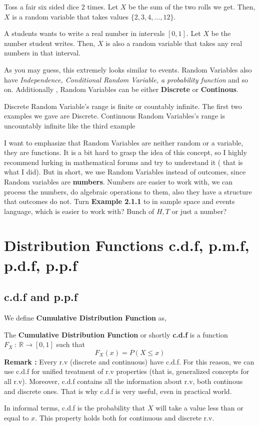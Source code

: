 \begin{example}
    Toss a fair six sided dice 2 times. Let $X$ be the sum of the two rolls we get. Then, $X$ is a random variable that takes values
    $\{2,3,4,...,12\}$.
\end{example}

\begin{example}
    A students wants to write a real number in intervals $[0,1]$. Let $X$ be the number student writes. Then, $X$ is also a random variable
    that takes any real numbers in that interval.
\end{example}

As you may guess, this extremely looks similar to events. Random Variables also have \textit{Independence, Conditional Random Variable, a
probability function} and so on. Additionally , Random Variables can be either \textbf{Discrete} or \textbf{Continous}.
\par
Discrete Random Variable's range is finite or countably infinite. The first two examples we gave are Discrete. Continuous Random
Variables's range is uncountably infinite like the third example \newline

I want to emphasize  that Random Variables are neither random or a variable, they are functions. It is a bit hard to grasp the idea of this
concept, so I highly recommend lurking in mathematical forums and try to understand it ( that is what I did). But in short, we use Random
Variables instead of outcomes, since Random variables are \textbf{numbers}. Numbers are easier to work with, we can process the numbers, do
algebraic operations to them, also they have a structure that outcomes do not.
Turn \textbf{ Example 2.1.1} to in sample space and events language, which is easier to work with? Bunch of $H,T$ or just a number?


\section{Distribution Functions c.d.f, p.m.f, p.d.f, p.p.f}
\subsection*{c.d.f and p.p.f}
We define  \textbf{Cumulative Distribution Function} as,

\begin{definition}
    The \textbf{Cumulative Distribution Function} or shortly \textbf{c.d.f} is a function $F_X \ : \ \mathbb{R} \rightarrow [0,1]$ such that
    \[ F_X(x) = P( X \le x) \]
    \textbf{Remark :} Every r.v (discrete and continuous) have c.d.f. For this reason, we can use c.d.f for unified treatment of r.v
    properties (that is, generalized concepts for all r.v). Moreover, c.d.f contains all the information about r.v, both continous and
    discrete ones. That is why c.d.f is very useful, even in practical world.
\end{definition}
\par
In informal terms, c.d.f is the probability that $X$ will take a value less than or equal to $x$. This property holds both for continuous
and discrete r.v.

